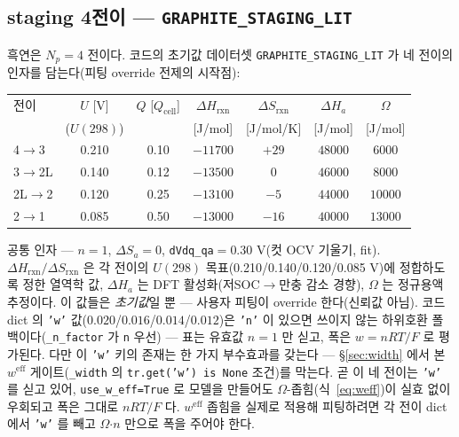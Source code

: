 \documentclass[11pt,a4paper]{article}
\newcommand{\eff}{\mathrm{eff}}
\newcommand{\cell}{\mathrm{cell}}
\begin{document}
\subsection{staging 4전이 — \texttt{GRAPHITE\_STAGING\_LIT}}
흑연은 $N_p=4$ 전이다. 코드의 초기값 데이터셋 \texttt{GRAPHITE\_STAGING\_LIT} 가 네 전이의 인자를 담는다(피팅 override 전제의 시작점):
\begin{center}
\renewcommand{\arraystretch}{1.25}
\begin{tabular}{l c c c c c c}
\toprule
전이 & $U$ [V] & $Q$ [$Q_\cell$] & $\Delta H_{\mathrm{rxn}}$ & $\Delta S_{\mathrm{rxn}}$ & $\Delta H_a$ & $\Omega$ \\
 & ($U(298)$) & & [J/mol] & [J/mol/K] & [J/mol] & [J/mol] \\
\midrule
4$\to$3   & 0.210 & 0.10 & $-11700$ & $+29$ & $48000$ & $6000$ \\
3$\to$2L  & 0.140 & 0.12 & $-13500$ & $0$   & $46000$ & $8000$ \\
2L$\to$2  & 0.120 & 0.25 & $-13100$ & $-5$  & $44000$ & $10000$ \\
2$\to$1   & 0.085 & 0.50 & $-13000$ & $-16$ & $40000$ & $13000$ \\
\bottomrule
\end{tabular}
\end{center}
공통 인자 — $n=1$, $\Delta S_a=0$, \texttt{dVdq\_qa}$=0.30$ V(컷 OCV 기울기, fit). $\Delta H_{\mathrm{rxn}}/\Delta S_{\mathrm{rxn}}$ 은 각 전이의 $U(298)$ 목표(0.210/0.140/0.120/0.085 V)에 정합하도록 정한 열역학 값, $\Delta H_a$ 는 DFT 활성화(저SOC$\to$만충 감소 경향), $\Omega$ 는 정규용액 추정이다. 이 값들은 \emph{초기값}일 뿐 — 사용자 피팅이 override 한다(신뢰값 아님). 코드 dict 의 \texttt{'w'} 값($0.020$/$0.016$/$0.014$/$0.012$)은 \texttt{'n'} 이 있으면 쓰이지 않는 하위호환 폴백이다(\texttt{\_n\_factor} 가 \texttt{n} 우선) — 표는 유효값 $n=1$ 만 싣고, 폭은 $w=nRT/F$ 로 평가된다. 다만 이 \texttt{'w'} 키의 존재는 한 가지 부수효과를 갖는다 — \S\ref{sec:width} 에서 본 $w^\eff$ 게이트(\texttt{\_width} 의 \texttt{tr.get('w') is None} 조건)를 막는다. 곧 이 네 전이는 \texttt{'w'} 를 싣고 있어, \texttt{use\_w\_eff=True} 로 모델을 만들어도 $\Omega$-좁힘(식~\eqref{eq:weff})이 실효 없이 우회되고 폭은 그대로 $nRT/F$ 다. $w^\eff$ 좁힘을 실제로 적용해 피팅하려면 각 전이 dict 에서 \texttt{'w'} 를 빼고 $\Omega$$\cdot$$n$ 만으로 폭을 주어야 한다.
\end{document}
